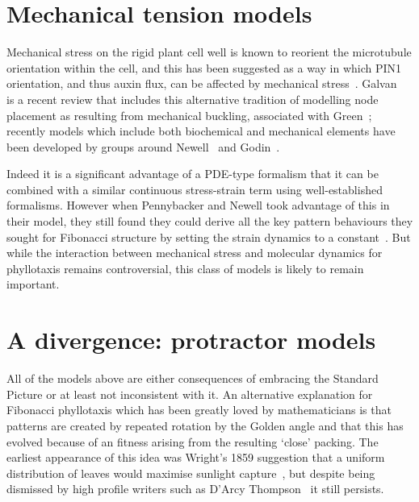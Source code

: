 \section{Mechanical tension models}
Mechanical stress on the rigid plant cell well is known to reorient the microtubule orientation within the cell, and this has been suggested as a way in which PIN1 orientation, and thus auxin flux, can be affected by mechanical stress~\autocite{heislerAlignmentPIN1Polarity2010}. Galvan~\autocite{galvan-ampudiaPhyllotaxisPatternsOrganogenesis2016} is a recent review that includes this alternative tradition of modelling node placement as resulting from mechanical buckling, associated with Green~\cite{greenPhyllotacticPatternsBiophysical1996};  recently models which include both biochemical and mechanical elements have been developed by groups around Newell~\cite{newellFibonacciPatternsCommon2013} and Godin~\cite{galvan-ampudiaTemporalIntegrationAuxin2020}.  

Indeed it is a significant advantage of a PDE-type formalism that it can be combined with a similar continuous stress-strain term using  well-established formalisms. However when Pennybacker and Newell took advantage of this in their model, they still found they could derive all the key pattern behaviours they sought for Fibonacci structure by setting the strain dynamics to a constant~\autocite{pennybackerPhyllotaxisProgressStory2015}. But while the interaction between mechanical stress and molecular dynamics for phyllotaxis remains controversial, this class of models is likely to remain important.


\section{A divergence: protractor models}
All of the models above are either consequences of embracing the Standard Picture or at least not inconsistent with it. 
An alternative  explanation for Fibonacci phyllotaxis which has been greatly loved by mathematicians is that patterns are created by
repeated rotation by the Golden angle and that this has evolved because of an fitness arising from the resulting `close' packing. The earliest appearance of this idea was Wright's 1859 suggestion that a uniform distribution of leaves would maximise sunlight capture~\autocite{wrightMostThoroughUniform1859}, but despite being dismissed by high profile writers such as D'Arcy Thompson~\cite{thompsonGrowthForm1917} it still persists.

